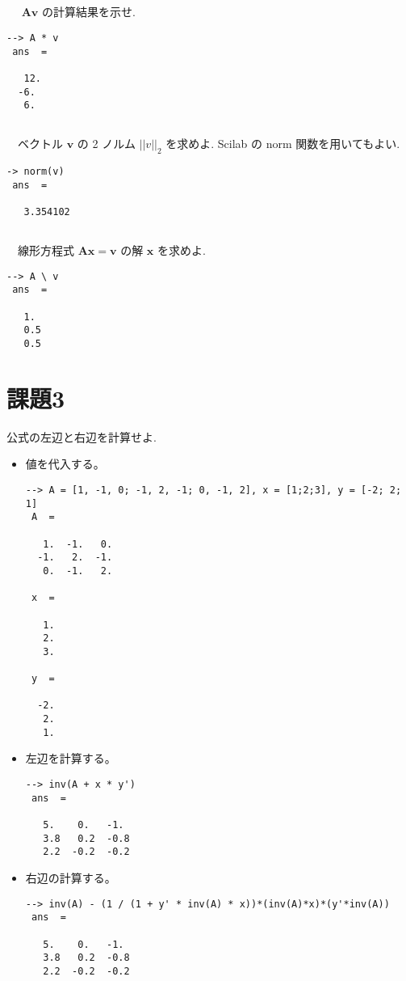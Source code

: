 \documentclass[a4j, 11pt]{jarticle}
\begin{document}
\subsection{}
\label{sec:orge422a4d}
　 \(\bm{A}\bm{v}\) の計算結果を示せ.\\
\begin{verbatim}
--> A * v
 ans  =

   12.
  -6.
   6.
\end{verbatim}

\subsection{}
\label{sec:org38e22c1}
　ベクトル \(\bm{v}\) の 2 ノルム \(||v||_2\) を求めよ. Scilab の norm 関数を用いてもよい.\\
\begin{verbatim}
-> norm(v)
 ans  =

   3.354102
\end{verbatim}
\subsection{}
\label{sec:org2564028}
　線形方程式 \(\bm{A}\bm{x} = \bm{v}\) の解 \(\bm{x}\) を求めよ.\\
\begin{verbatim}
--> A \ v
 ans  =

   1.
   0.5
   0.5
\end{verbatim}

\section{課題3}
\label{sec:org1070888}
公式の左辺と右辺を計算せよ.\\
\begin{itemize}
\item 値を代入する。\\
\begin{verbatim}
--> A = [1, -1, 0; -1, 2, -1; 0, -1, 2], x = [1;2;3], y = [-2; 2; 1]
 A  = 

   1.  -1.   0.
  -1.   2.  -1.
   0.  -1.   2.

 x  = 

   1.
   2.
   3.

 y  = 

  -2.
   2.
   1.
\end{verbatim}
\item 左辺を計算する。\\
\begin{verbatim}
--> inv(A + x * y')
 ans  =

   5.    0.   -1. 
   3.8   0.2  -0.8
   2.2  -0.2  -0.2
\end{verbatim}
\item 右辺の計算する。\\
\begin{verbatim}
--> inv(A) - (1 / (1 + y' * inv(A) * x))*(inv(A)*x)*(y'*inv(A))
 ans  =

   5.    0.   -1. 
   3.8   0.2  -0.8
   2.2  -0.2  -0.2
\end{verbatim}
\end{itemize}
\end{document}
